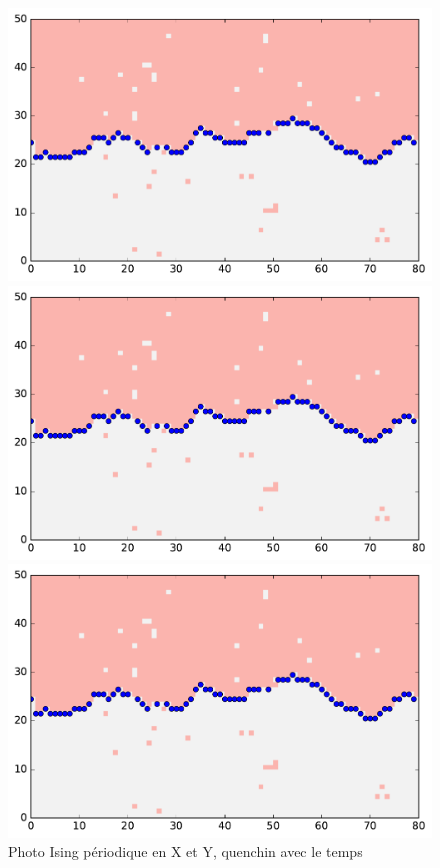 \begin{figure}
	\begin{minipage}[t]{0.33\linewidth}
		\includegraphics[width=\linewidth]{isingtosos/snap07.pdf}
	\end{minipage}%
	\begin{minipage}[t]{0.33\linewidth}
		\includegraphics[width=\linewidth]{isingtosos/snap07.pdf}
	\end{minipage}
	\begin{minipage}[t]{0.33\linewidth}
		\includegraphics[width=\linewidth]{isingtosos/snap07.pdf}
	\end{minipage}
	\caption{Photo Ising périodique en X et Y, quenchin avec le temps }
	\label{amas-quench}
\end{figure}

